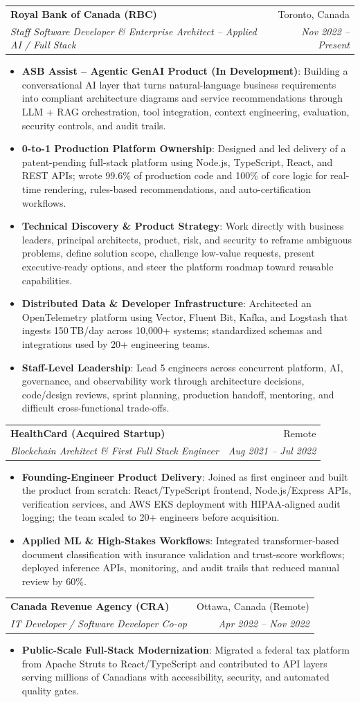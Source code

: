 \documentclass[letterpaper,9.5pt]{article}
\makeatletter
\newcommand{\resumeItem}[2]{\item\small{\textbf{#1}{: #2 \vspace{-2pt}}}}
\newcommand{\resumeSubheading}[4]{\vspace{-2pt}\item\begin{tabular*}{0.97\textwidth}{l@{\extracolsep{\fill}}r}\textbf{#1} & #2 \\\textit{\small#3} & \textit{\small #4} \\\end{tabular*}\vspace{-6pt}}
\newcommand{\resumeItemListStart}{\begin{itemize}}
\newcommand{\resumeItemListEnd}{\end{itemize}\vspace{-6pt}}
\makeatother
\begin{document}
  \resumeSubheading
    {Royal Bank of Canada (RBC)}{Toronto, Canada}
    {Staff Software Developer \& Enterprise Architect -- Applied AI / Full Stack}{Nov 2022 -- Present}
  \resumeItemListStart
    \resumeItem{ASB Assist -- Agentic GenAI Product (In Development)}
      {Building a conversational AI layer that turns natural-language business requirements into compliant architecture diagrams and service recommendations through LLM + RAG orchestration, tool integration, context engineering, evaluation, security controls, and audit trails.}
    \resumeItem{0-to-1 Production Platform Ownership}
      {Designed and led delivery of a patent-pending full-stack platform using Node.js, TypeScript, React, and REST APIs; wrote 99.6\% of production code and 100\% of core logic for real-time rendering, rules-based recommendations, and auto-certification workflows.}
    \resumeItem{Technical Discovery \& Product Strategy}
      {Work directly with business leaders, principal architects, product, risk, and security to reframe ambiguous problems, define solution scope, challenge low-value requests, present executive-ready options, and steer the platform roadmap toward reusable capabilities.}
    \resumeItem{Distributed Data \& Developer Infrastructure}
      {Architected an OpenTelemetry platform using Vector, Fluent Bit, Kafka, and Logstash that ingests 150\,TB/day across 10,000+ systems; standardized schemas and integrations used by 20+ engineering teams.}
    \resumeItem{Staff-Level Leadership}
      {Lead 5 engineers across concurrent platform, AI, governance, and observability work through architecture decisions, code/design reviews, sprint planning, production handoff, mentoring, and difficult cross-functional trade-offs.}
  \resumeItemListEnd

  \resumeSubheading
    {HealthCard (Acquired Startup)}{Remote}
    {Blockchain Architect \& First Full Stack Engineer}{Aug 2021 -- Jul 2022}
  \resumeItemListStart
    \resumeItem{Founding-Engineer Product Delivery}
      {Joined as first engineer and built the product from scratch: React/TypeScript frontend, Node.js/Express APIs, verification services, and AWS EKS deployment with HIPAA-aligned audit logging; the team scaled to 20+ engineers before acquisition.}
    \resumeItem{Applied ML \& High-Stakes Workflows}
      {Integrated transformer-based document classification with insurance validation and trust-score workflows; deployed inference APIs, monitoring, and audit trails that reduced manual review by 60\%.}
  \resumeItemListEnd

  \resumeSubheading
    {Canada Revenue Agency (CRA)}{Ottawa, Canada (Remote)}
    {IT Developer / Software Developer Co-op}{Apr 2022 -- Nov 2022}
  \resumeItemListStart
    \resumeItem{Public-Scale Full-Stack Modernization}
      {Migrated a federal tax platform from Apache Struts to React/TypeScript and contributed to API layers serving millions of Canadians with accessibility, security, and automated quality gates.}
  \resumeItemListEnd
\end{document}
